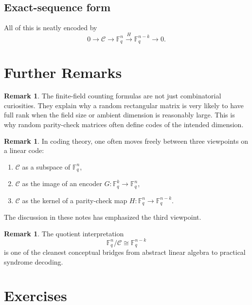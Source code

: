 \documentclass[11pt]{article}
\newcommand{\F}{\mathbb{F}}
\newcommand{\cC}{\mathcal{C}}
\theoremstyle{definition}
\newtheorem{remark}[definition]{Remark}
\theoremstyle{plain}
\begin{document}
	\subsection*{Exact-sequence form}
	
	All of this is neatly encoded by
	\[
	0 \longrightarrow \cC \longrightarrow \F_q^n \xrightarrow{\,H\,} \F_q^{n-k} \longrightarrow 0.
	\]
	
	\section{Further Remarks}
	
	\begin{remark}
		The finite-field counting formulas are not just combinatorial curiosities. They explain why a random rectangular matrix is very likely to have full rank when the field size or ambient dimension is reasonably large. This is why random parity-check matrices often define codes of the intended dimension.
	\end{remark}
	
	\begin{remark}
		In coding theory, one often moves freely between three viewpoints on a linear code:
		\begin{enumerate}[label=\textnormal{(\arabic*)}, leftmargin=2.5em]
			\item \(\cC\) as a subspace of \(\F_q^n\),
			\item \(\cC\) as the image of an encoder \(G:\F_q^k\to \F_q^n\),
			\item \(\cC\) as the kernel of a parity-check map \(H:\F_q^n\to \F_q^{n-k}\).
		\end{enumerate}
		The discussion in these notes has emphasized the third viewpoint.
	\end{remark}
	
	\begin{remark}
		The quotient interpretation
		\[
		\F_q^n/\cC \cong \F_q^{n-k}
		\]
		is one of the cleanest conceptual bridges from abstract linear algebra to practical syndrome decoding.
	\end{remark}
	
	\section*{Exercises}
	
\end{document}
